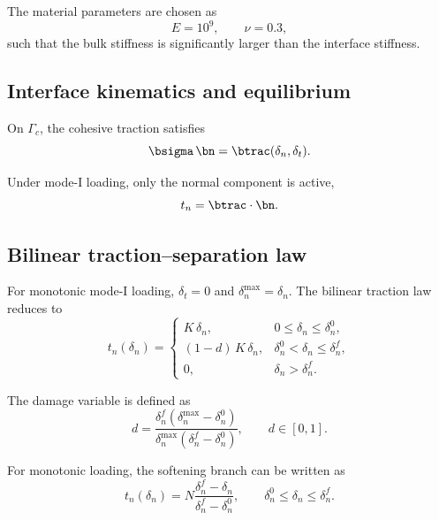 The material parameters are chosen as
\begin{equation}
E = 10^{9}, \qquad \nu = 0.3,
\end{equation}
such that the bulk stiffness is significantly larger than the interface stiffness.

\subsection{Interface kinematics and equilibrium}

On $\Gamma_c$, the cohesive traction satisfies
\begin{equation}
\bsigma\,\bn = \btrac(\delta_n, \delta_t).
\end{equation}

Under mode-I loading, only the normal component is active,
\begin{equation}
t_n = \btrac \cdot \bn.
\end{equation}

\subsection{Bilinear traction--separation law}

For monotonic mode-I loading, $\delta_t = 0$ and $\delta_n^{\max} = \delta_n$.
The bilinear traction law reduces to
\begin{equation}
t_n(\delta_n) =
\begin{cases}
K\,\delta_n, & 0 \le \delta_n \le \delta_n^0, \\[6pt]
(1-d)\,K\,\delta_n, & \delta_n^0 < \delta_n \le \delta_n^f, \\[6pt]
0, & \delta_n > \delta_n^f.
\end{cases}
\end{equation}

The damage variable is defined as
\begin{equation}
d =
\frac{\delta_n^f \left(\delta_n^{\max} - \delta_n^0\right)}
{\delta_n^{\max} \left(\delta_n^f - \delta_n^0\right)},
\qquad d \in [0,1].
\end{equation}

For monotonic loading, the softening branch can be written as
\begin{equation}
t_n(\delta_n) =
N \frac{\delta_n^f - \delta_n}{\delta_n^f - \delta_n^0},
\qquad
\delta_n^0 \le \delta_n \le \delta_n^f.
\end{equation}

